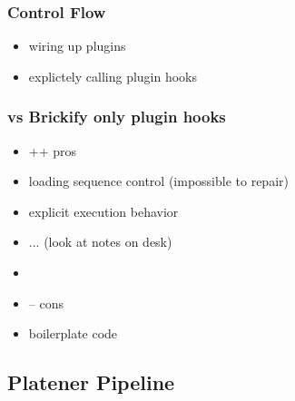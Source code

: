 \documentclass[../ClassicThesis.tex]{subfiles}
\begin{document}

\subsubsection{Control Flow}

\begin{itemize}
\item wiring up plugins
\item explictely calling plugin hooks
\end{itemize}

\subsubsection{vs Brickify only plugin hooks}

\begin{itemize}
\item ++ pros
\item loading sequence control (impossible to repair)
\item explicit execution behavior
\item ... (look at notes on desk)
\item 
\item -- cons
\item boilerplate code
\end{itemize}

\subsection{Platener Pipeline}
\end{document}
